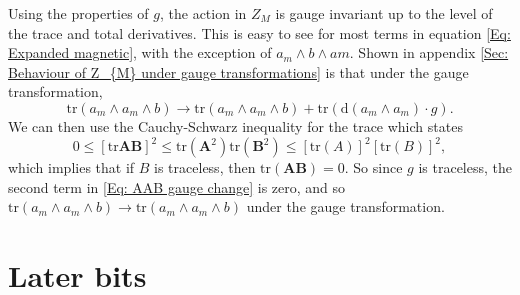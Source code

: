 \documentclass{article}
\begin{document}
\noindent Using the properties of $g$, the action in $Z_{M}$ is gauge invariant up to the level of the trace and total derivatives. This is easy to see for most terms in equation \eqref{Eq: Expanded magnetic}, with the exception of $a_{m}\wedge b \wedge a{m}$. Shown in appendix \ref{Sec: Behaviour of Z_{M} under gauge transformations} is that under the gauge transformation, 
\begin{equation}
    \label{Eq: AAB gauge change}
    \text{tr}\left(a_{m}\wedge a_{m}\wedge b\right)\rightarrow \text{tr}\left(a_{m}\wedge a_{m}\wedge b\right) + \text{tr}\left(\mathrm{d}\left(a_{m}\wedge a_{m}\right)\cdot g\right).
\end{equation}
We can then use the Cauchy-Schwarz inequality for the trace which states
\begin{equation}
    0\leq \left[\text{tr}\mathbf{AB}\right]^{2}\leq \text{tr}\left(\mathbf{A}^{2}\right)\text{tr}\left(\mathbf{B}^{2}\right)\leq \left[\text{tr}\left(A\right)\right]^{2}\left[\text{tr}\left(B\right)\right]^{2},
\end{equation}
which implies that if $B$ is traceless, then $\text{tr}\left(\mathbf{AB}\right)=0$. So since $g$ is traceless, the second term in \eqref{Eq: AAB gauge change} is zero, and so $\text{tr}\left(a_{m}\wedge a_{m}\wedge b\right)\rightarrow \text{tr}\left(a_{m}\wedge a_{m}\wedge b\right)$ under the gauge transformation.

\section{Later bits}





\appendix
\newpage
\end{document}
